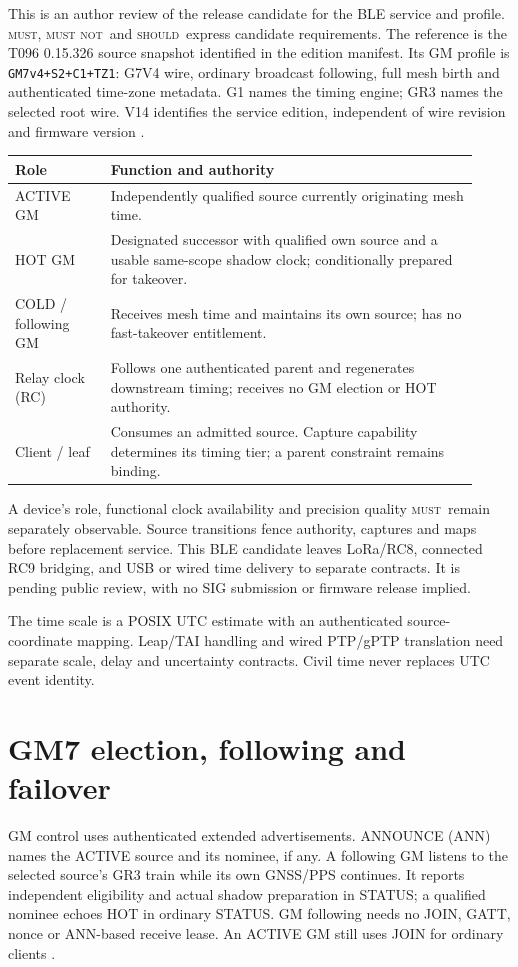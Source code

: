 \documentclass[11pt,letterpaper]{article}
\newcommand{\must}{\textsc{must}}\newcommand{\mustnot}{\textsc{must not}}\newcommand{\should}{\textsc{should}}\newcommand{\code}[1]{\texttt{#1}}\newcommand{\page}{\clearpage}
\begin{document}
This is an author review of the release candidate for the BLE service and profile. \must, \mustnot\ and \should\ express candidate requirements. The reference is the T096 0.15.326 source snapshot identified in the edition manifest. Its GM profile is \code{GM7v4+S2+C1+TZ1}: G7V4 wire, ordinary broadcast following, full mesh birth and authenticated time-zone metadata. G1 names the timing engine; GR3 names the selected root wire. V14 identifies the service edition, independent of wire revision and firmware version \cite{gm7,tz,wire}.
\begin{center}\small
\begin{tabular}{@{}L{0.19\linewidth}L{0.73\linewidth}@{}}\toprule
Role & Function and authority\\\midrule
ACTIVE GM & Independently qualified source currently originating mesh time.\\
HOT GM & Designated successor with qualified own source and a usable same-scope shadow clock; conditionally prepared for takeover.\\
COLD / following GM & Receives mesh time and maintains its own source; has no fast-takeover entitlement.\\
Relay clock (RC) & Follows one authenticated parent and regenerates downstream timing; receives no GM election or HOT authority.\\
Client / leaf & Consumes an admitted source. Capture capability determines its timing tier; a parent constraint remains binding.\\
\bottomrule\end{tabular}\end{center}
A device's role, functional clock availability and precision quality \must\ remain separately observable. Source transitions fence authority, captures and maps before replacement service. This BLE candidate leaves LoRa/RC8, connected RC9 bridging, and USB or wired time delivery to separate contracts. It is pending public review, with no SIG submission or firmware release implied.

The time scale is a POSIX UTC estimate with an authenticated source-coordinate mapping. Leap/TAI handling and wired PTP/gPTP translation need separate scale, delay and uncertainty contracts. Civil time never replaces UTC event identity.

\page
\section{GM7 election, following and failover}
GM control uses authenticated extended advertisements. ANNOUNCE (ANN) names the ACTIVE source and its nominee, if any. A following GM listens to the selected source's GR3 train while its own GNSS/PPS continues. It reports independent eligibility and actual shadow preparation in STATUS; a qualified nominee echoes HOT in ordinary STATUS. GM following needs no JOIN, GATT, nonce or ANN-based receive lease. An ACTIVE GM still uses JOIN for ordinary clients \cite{gm7}.
\end{document}

